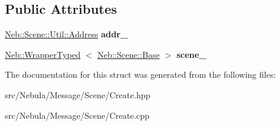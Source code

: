 \subsection*{\-Public \-Attributes}
\begin{DoxyCompactItemize}
\item 
\hypertarget{structNeb_1_1Message_1_1Scene_1_1Create_a153eb033fce14632f7ba8259bc754bd9}{\hyperlink{classNeb_1_1Scene_1_1Util_1_1Address}{\-Neb\-::\-Scene\-::\-Util\-::\-Address} {\bfseries addr\-\_\-}}\label{structNeb_1_1Message_1_1Scene_1_1Create_a153eb033fce14632f7ba8259bc754bd9}

\item 
\hypertarget{structNeb_1_1Message_1_1Scene_1_1Create_a49efd907dbc1a014114113a2b5288598}{\hyperlink{classNeb_1_1WrapperTyped}{\-Neb\-::\-Wrapper\-Typed}\*
$<$ \hyperlink{classNeb_1_1Scene_1_1Base}{\-Neb\-::\-Scene\-::\-Base} $>$ {\bfseries scene\-\_\-}}\label{structNeb_1_1Message_1_1Scene_1_1Create_a49efd907dbc1a014114113a2b5288598}

\end{DoxyCompactItemize}


\-The documentation for this struct was generated from the following files\-:\begin{DoxyCompactItemize}
\item 
src/\-Nebula/\-Message/\-Scene/\-Create.\-hpp\item 
src/\-Nebula/\-Message/\-Scene/\-Create.\-cpp\end{DoxyCompactItemize}
